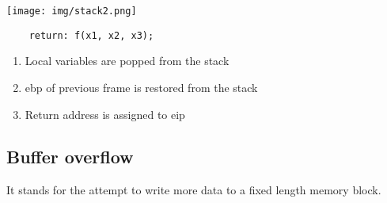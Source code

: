 \documentclass[a4paper, 10pt, titlepage]{article}
\begin{document}
\begin{minipage}{0.32\textwidth}
\texttt{[image: img/stack2.png]}
\end{minipage} \hfill
\begin{minipage}{0.6\textwidth}
\begin{verbatim}
	return: f(x1, x2, x3);
\end{verbatim}
\begin{enumerate}
\item Local variables are popped from the stack
\item ebp of previous frame is restored from the stack
\item Return address is assigned to eip 
\end{enumerate}
\end{minipage}

\subsection{Buffer overflow}
It stands for the attempt to write more data to a fixed length memory block.
	
\end{document}
